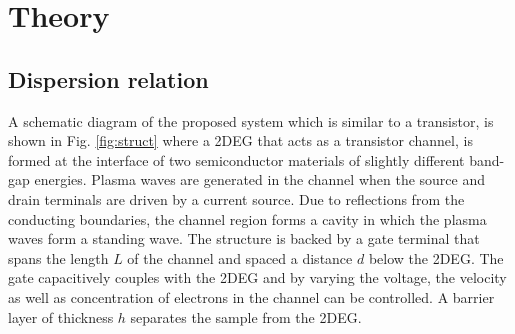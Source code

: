 \documentclass[11pt]{article}
\begin{document}
\section{Theory}
\subsection{Dispersion relation}
%
A schematic diagram of the proposed system which is similar to a transistor, is shown in Fig. \ref{fig:struct} where a 2DEG that acts as a transistor channel, is formed at the interface of two semiconductor materials of slightly different band-gap energies. Plasma waves are generated in the channel when the source and drain terminals are driven by a current source. Due to reflections from the conducting boundaries, the channel region forms a cavity in which the plasma waves form a standing wave. The structure is backed by a gate terminal that spans the length $L$ of the channel and spaced a distance $d$ below the 2DEG. The gate capacitively couples with the 2DEG and by varying the voltage, the velocity as well as concentration of electrons in the channel can be controlled. A barrier layer of thickness $h$ separates the sample from the 2DEG.
\end{document}
